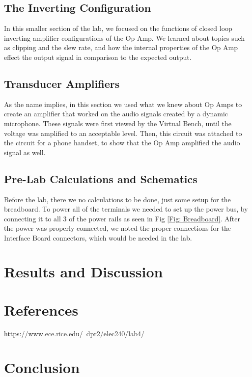 \documentclass[10pt]{article}
\begin{document}
\subsection{The Inverting Configuration}
In this smaller section of the lab, we focused on the functions of closed loop inverting amplifier configurations of the Op Amp. We learned about topics such as clipping and the slew rate, and how the internal properties of the Op Amp effect the output signal in comparison to the expected output.
\subsection{Transducer Amplifiers}
As the name implies, in this section we used what we knew about Op Amps to create an amplifier that worked on the audio signals created by a dynamic microphone. These signals were first viewed by the Virtual Bench, until the voltage was amplified to an acceptable level. Then, this circuit was attached to the circuit for a phone handset, to show that the Op Amp amplified the audio signal as well. 

\subsection{Pre-Lab Calculations and Schematics}

Before the lab, there we no calculations to be done, just some setup for the breadboard. To power all of the terminals we needed to set up the power bus, by connecting it to all 3 of the power rails as seen in Fig \ref{Fig: Breadboard}. After the power was properly connected, we noted the proper connections for the Interface Board connectors, which would be needed in the lab.

\section{Results and Discussion}



\section{References}

https://www.ece.rice.edu/~dpr2/elec240/lab4/

\section{Conclusion}
\end{document}
